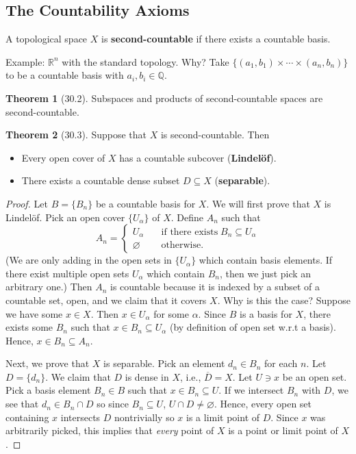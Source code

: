 \documentclass{article}
\newcommand{\nline}{\vspace*{0.5\baselineskip}}
\theoremstyle{definition}
\newtheorem{theorem}{Theorem}[subsection]
\begin{document}
\begin{flushleft}
\subsection{The Countability Axioms}

A topological space $X$ is \textbf{second-countable} if there exists a countable basis.

\nline

Example: $\mathbb{R}^n$ with the standard topology. Why? Take $\{(a_1,b_1) \times \cdots \times (a_n, b_n)\}$ to be a countable basis with $a_i, b_i \in \mathbb{Q}$.

\begin{theorem}[30.2]
Subspaces and products of second-countable spaces are second-countable.
\end{theorem}

\begin{theorem}[30.3]
Suppose that $X$ is second-countable. Then
\begin{itemize}
    \item Every open cover of $X$ has a countable subcover (\textbf{Lindel\"of}).
    \item There exists a countable dense subset $D \subseteq X$ (\textbf{separable}).
\end{itemize}
\end{theorem}

\begin{proof}
Let $B = \{B_n\}$ be a countable basis for $X$. We will first prove that $X$ is Lindel\"of. Pick an open cover $\{U_\alpha\}$ of $X$. Define $A_n$ such that
\[
A_n = \begin{cases}
U_\alpha &\quad \text{if there exists} \; B_n \subseteq U_\alpha \\
\varnothing &\quad \text{otherwise}.
\end{cases}
\]
(We are only adding in the open sets in $\{U_\alpha\}$ which contain basis elements. If there exist multiple open sets $U_\alpha$ which contain $B_n$, then we just pick an arbitrary one.) Then $A_n$ is countable because it is indexed by a subset of a countable set, open, and we claim that it covers $X$. Why is this the case? Suppose we have some $x \in X$. Then $x \in U_\alpha$ for some $\alpha$. Since $B$ is a basis for $X$, there exists some $B_n$ such that $x \in B_n \subseteq U_\alpha$ (by definition of open set w.r.t a basis). Hence, $x \in B_n \subseteq A_n$.

\nline

Next, we prove that $X$ is separable. Pick an element $d_n \in B_n$ for each $n$. Let $D = \{d_n\}$. We claim that $D$ is dense in $X$, i.e., $\overline{D} = X$. Let $U \ni x$ be an open set. Pick a basis element $B_n \in B$ such that $x \in B_n \subseteq U$. If we intersect $B_n$ with $D$, we see that $d_n \in B_n \cap D$ so since $B_n \subseteq U$, $U \cap D \neq \varnothing$. Hence, every open set containing $x$ intersects $D$ nontrivially so $x$ is a limit point of $D$. Since $x$ was arbitrarily picked, this implies that \textit{every} point of $X$ is a point or limit point of $X$.
\end{proof}


\end{flushleft}
\end{document}

